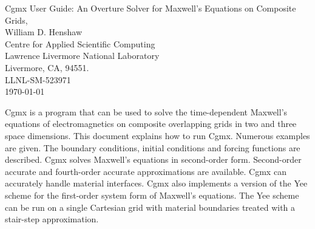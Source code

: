 \documentclass{article}
\begin{document}


\def\ud     {{    U}}
\def\pd     {{    P}}

\newcommand{\mbar}{\bar{m}}
\newcommand{\Rbar}{\bar{R}}
\newcommand{\Ru}{R_u}         %
\newcommand{\Div}{\grad\cdot}
\newcommand{\tauv}{\boldsymbol{\tau}}
\newcommand{\sumi}{\sum_{i=1}^n}
\newcommand{\dt}{{\Delta t}}
\newcommand{\eps}{\epsilon}

\baselineskip
\begin{flushleft}
{\Large
Cgmx User Guide: An Overture Solver for Maxwell's Equations on Composite Grids, \\
}
\vspace{2\baselineskip}
William D. Henshaw  \\
Centre for Applied Scientific Computing  \\
Lawrence Livermore National Laboratory      \\
Livermore, CA, 94551.  \\
\vspace{\baselineskip}
LLNL-SM-523971 \\
\vspace{\baselineskip}
\today\\
\vspace{\baselineskip}

\vspace{4\baselineskip}


Cgmx is a program that can be used to solve the time-dependent Maxwell's equations
of electromagnetics on composite overlapping grids in two and three space
dimensions. This document explains how to run Cgmx. Numerous examples are
given. The boundary conditions, initial conditions and forcing functions 
are described.
Cgmx solves Maxwell's equations in second-order form. Second-order
accurate and fourth-order accurate approximations are available. Cgmx can
accurately handle material interfaces.  Cgmx also implements a version of the
Yee scheme for the first-order system form of Maxwell's equations. The Yee
scheme can be run on a single Cartesian grid with material boundaries treated
with a stair-step approximation.

\end{flushleft}
\end{document}
